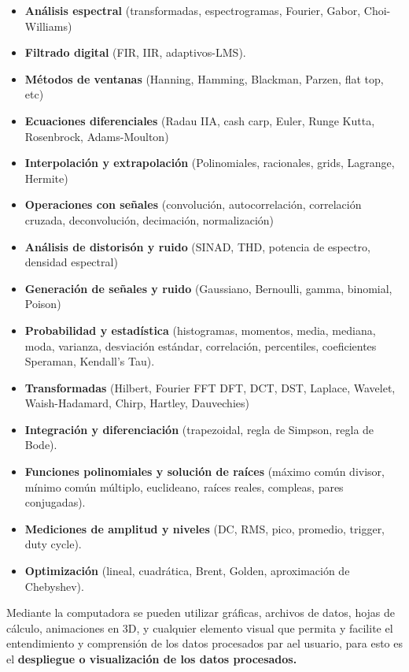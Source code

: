 \documentclass[12pt,letterpaper, onecolumn, titlepage, oneside]{book}
\begin{document}
\begin{itemize}
    \item \textbf{Análisis espectral} (transformadas, espectrogramas, Fourier, Gabor, Choi-Williams)
    \item \textbf{Filtrado digital} (FIR, IIR, adaptivos-LMS).
    \item \textbf{Métodos de ventanas} (Hanning, Hamming, Blackman, Parzen, flat top, etc)
    \item \textbf{Ecuaciones diferenciales} (Radau IIA, cash carp, Euler, Runge Kutta, Rosenbrock, Adams-Moulton)
    \item \textbf{Interpolación y extrapolación} (Polinomiales, racionales, grids, Lagrange, Hermite)
    \item \textbf{Operaciones con señales} (convolución, autocorrelación, correlación cruzada, deconvolución, decimación, normalización)
    \item \textbf{Análisis de distorisón y ruido} (SINAD, THD, potencia de espectro, densidad espectral)
    \item \textbf{Generación de señales y ruido} (Gaussiano, Bernoulli, gamma, binomial, Poison)
    \item \textbf{Probabilidad y estadística} (histogramas, momentos, media, mediana, moda, varianza, desviación estándar, correlación, percentiles, coeficientes Speraman, Kendall's Tau).
    \item \textbf{Transformadas} (Hilbert, Fourier FFT DFT, DCT, DST, Laplace, Wavelet, Waish-Hadamard, Chirp, Hartley, Dauvechies)
    \item \textbf{Integración y diferenciación} (trapezoidal, regla de Simpson, regla de Bode).
    \item \textbf{Funciones polinomiales y solución de raíces} (máximo común divisor, mínimo común múltiplo, euclideano, raíces reales, compleas, pares conjugadas).
    \item \textbf{Mediciones de amplitud y niveles} (DC, RMS, pico, promedio, trigger, duty cycle).
    \item \textbf{Optimización} (lineal, cuadrática, Brent, Golden, aproximación de Chebyshev).
\end{itemize}

Mediante la computadora se pueden utilizar gráficas, archivos de datos, hojas de cálculo, animaciones en 3D, y cualquier elemento visual que permita y facilite el entendimiento y comprensión de los datos procesados par ael usuario, para esto es el \textbf{despliegue o visualización de los datos procesados.}
\end{document}

